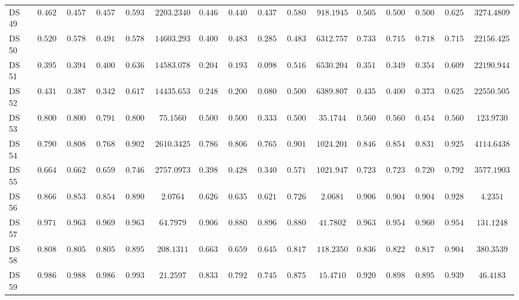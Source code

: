 {\begin{longtable}{|l|ccccc|ccccc|ccccc|}
		DS 49 & $0.4628$ & $0.4574$ & $0.4576$ & $0.5930$ & $2203.2340$ & $0.4468$ & $0.4402$ & $0.4374$ & $0.5802$ & $918.1945$ & $0.5053$ & $\boldsymbol{0.5007}$ & $\boldsymbol{0.5009}$ & $\boldsymbol{0.6255}$ & $3274.4809$ \\
		DS 50 & $0.5200$ & $0.5782$ & $0.4918$ & $0.5782$ & $14603.2932$ & $0.4000$ & $0.4839$ & $0.2857$ & $0.4839$ & $6312.7570$ & $0.7333$ & $0.7155$ & $0.7189$ & $0.7155$ & $22156.4253$ \\
		DS 51 & $0.3956$ & $\boldsymbol{0.3946}$ & $\boldsymbol{0.4002}$ & $\boldsymbol{0.6368}$ & $14583.0781$ & $0.2044$ & $0.1935$ & $0.0982$ & $0.5161$ & $6530.2048$ & $0.3511$ & $0.3499$ & $0.3542$ & $0.6099$ & $22190.9448$ \\
		DS 52 & $0.4311$ & $0.3877$ & $0.3421$ & $0.6173$ & $14435.6539$ & $0.2489$ & $0.2000$ & $0.0800$ & $0.5000$ & $6389.8071$ & $\boldsymbol{0.4356}$ & $\boldsymbol{0.4005}$ & $\boldsymbol{0.3735}$ & $\boldsymbol{0.6253}$ & $22550.5055$ \\
		DS 53 & $\boldsymbol{0.8000}$ & $\boldsymbol{0.8000}$ & $\boldsymbol{0.7917}$ & $\boldsymbol{0.8000}$ & $75.1560$ & $0.5000$ & $0.5000$ & $0.3333$ & $0.5000$ & $35.1744$ & $0.5600$ & $0.5600$ & $0.4544$ & $0.5600$ & $123.9730$ \\
		DS 54 & $0.7900$ & $0.8081$ & $0.7682$ & $0.9024$ & $2610.3425$ & $0.7867$ & $0.8060$ & $0.7658$ & $0.9014$ & $1024.2017$ & $\boldsymbol{0.8467}$ & $\boldsymbol{0.8541}$ & $\boldsymbol{0.8316}$ & $\boldsymbol{0.9258}$ & $4114.6438$ \\
		DS 55 & $0.6649$ & $0.6620$ & $0.6594$ & $0.7465$ & $2757.0973$ & $0.3989$ & $0.4287$ & $0.3406$ & $0.5715$ & $1021.9471$ & $\boldsymbol{0.7234}$ & $\boldsymbol{0.7235}$ & $\boldsymbol{0.7209}$ & $\boldsymbol{0.7926}$ & $3577.1903$ \\
		DS 56 & $0.8667$ & $0.8534$ & $0.8544$ & $0.8901$ & $2.0764$ & $0.6267$ & $0.6355$ & $0.6212$ & $0.7267$ & $2.0681$ & $\boldsymbol{0.9067}$ & $\boldsymbol{0.9049}$ & $\boldsymbol{0.9041}$ & $\boldsymbol{0.9287}$ & $4.2351$ \\
		DS 57 & $0.9714$ & $0.9632$ & $0.9695$ & $0.9632$ & $64.7979$ & $0.9061$ & $0.8809$ & $0.8961$ & $0.8809$ & $41.7802$ & $0.9633$ & $0.9546$ & $0.9608$ & $0.9546$ & $131.1248$ \\
		DS 58 & $0.8085$ & $0.8057$ & $0.8055$ & $0.8959$ & $208.1311$ & $0.6631$ & $0.6598$ & $0.6450$ & $0.8178$ & $118.2350$ & $0.8369$ & $0.8225$ & $0.8175$ & $0.9049$ & $380.3539$ \\
		DS 59 & $\boldsymbol{0.9867}$ & $\boldsymbol{0.9886}$ & $\boldsymbol{0.9866}$ & $\boldsymbol{0.9932}$ & $21.2597$ & $0.8333$ & $0.7929$ & $0.7451$ & $0.8758$ & $15.4710$ & $0.9200$ & $0.8983$ & $0.8957$ & $0.9390$ & $46.4183$ \\

\end{longtable}}
